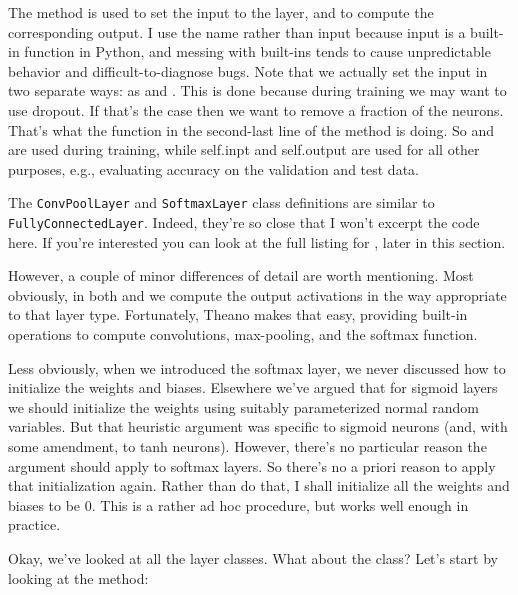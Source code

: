 \documentclass[a4paper,twoside,10pt]{book}
\begin{document}
The  method is used to set the input to the layer, and to compute the corresponding output. I use the name  rather than input because input is a built-in function in Python, and messing with built-ins tends to cause unpredictable behavior and difficult-to-diagnose bugs. Note that we actually set the input in two separate ways: as  and . This is done because during training we may want to use dropout. If that's the case then we want to remove a fraction  of the neurons. That's what the function  in the second-last line of the  method is doing. So  and  are used during training, while self.inpt and self.output are used for all other purposes, e.g., evaluating accuracy on the validation and test data.

The \texttt{ConvPoolLayer} and \texttt{SoftmaxLayer} class definitions are similar to \texttt{FullyConnectedLayer}. Indeed, they're so close that I won't excerpt the code here. If you're interested you can look at the full listing for , later in this section.

However, a couple of minor differences of detail are worth mentioning. Most obviously, in both  and  we compute the output activations in the way appropriate to that layer type. Fortunately, Theano makes that easy, providing built-in operations to compute convolutions, max-pooling, and the softmax function.

Less obviously, when we introduced the softmax layer, we never discussed how to initialize the weights and biases. Elsewhere we've argued that for sigmoid layers we should initialize the weights using suitably parameterized normal random variables. But that heuristic argument was specific to sigmoid neurons (and, with some amendment, to tanh neurons). However, there's no particular reason the argument should apply to softmax layers. So there's no a priori reason to apply that initialization again. Rather than do that, I shall initialize all the weights and biases to be 0. This is a rather ad hoc procedure, but works well enough in practice.

Okay, we've looked at all the layer classes. What about the  class? Let's start by looking at the  method:
\end{document}
